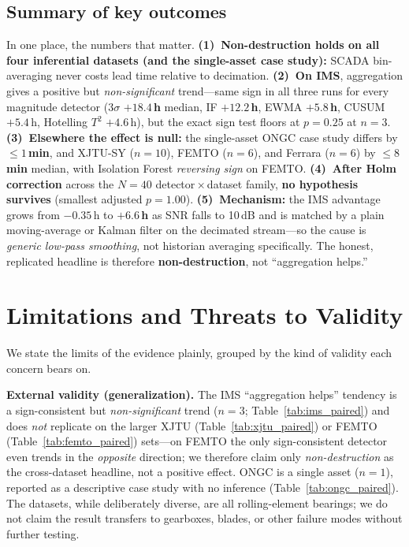 \documentclass[journal]{IEEEtran}
\begin{document}
\subsection{Summary of key outcomes}
In one place, the numbers that matter. \textbf{(1)~Non-destruction holds on all four inferential
datasets (and the single-asset case study):} SCADA bin-averaging never costs lead
time relative to decimation. \textbf{(2)~On IMS}, aggregation gives a positive but
\emph{non-significant} trend---same sign in all three runs for every magnitude
detector (3$\sigma$ \textbf{$+18.4$\,h} median, IF \textbf{$+12.2$\,h}, EWMA
\textbf{$+5.8$\,h}, CUSUM $+5.4$\,h, Hotelling $T^2$ $+4.6$\,h), but the exact
sign test floors at \textbf{$p{=}0.25$} at $n{=}3$. \textbf{(3)~Elsewhere the
effect is null:} the single-asset ONGC case study differs by \textbf{$\le1$\,min},
and XJTU-SY
($n{=}10$), FEMTO ($n{=}6$), and Ferrara ($n{=}6$) by \textbf{$\le8$\,min} median,
with Isolation Forest \emph{reversing sign} on FEMTO. \textbf{(4)~After Holm correction} across
the \textbf{$N{=}40$} detector\,$\times$\,dataset family, \textbf{no hypothesis
survives} (smallest adjusted $p{=}\mathbf{1.00}$). \textbf{(5)~Mechanism:} the
IMS advantage grows from $-0.35$\,h to \textbf{$+6.6$\,h} as SNR falls to 10\,dB
and is matched by a plain moving-average or Kalman filter on the decimated
stream---so the cause is \emph{generic low-pass smoothing}, not historian
averaging specifically. The honest, replicated headline is therefore
\textbf{non-destruction}, not ``aggregation helps.''

\section{Limitations and Threats to Validity}
\label{sec:threats}
We state the limits of the evidence plainly, grouped by the kind of validity
each concern bears on.

\textbf{External validity (generalization).} The IMS ``aggregation helps''
tendency is a sign-consistent but \emph{non-significant} trend ($n{=}3$;
Table~\ref{tab:ims_paired}) and does \emph{not} replicate on the larger XJTU
(Table~\ref{tab:xjtu_paired}) or FEMTO (Table~\ref{tab:femto_paired}) sets---on
FEMTO the only sign-consistent detector even trends in the \emph{opposite}
direction; we therefore claim only \emph{non-destruction} as
the cross-dataset headline, not a positive effect. ONGC is a single asset
($n{=}1$), reported as a descriptive case study with no inference
(Table~\ref{tab:ongc_paired}). The datasets, while deliberately diverse, are all rolling-element bearings; we do not claim the result transfers to
gearboxes, blades, or other failure modes without further testing.
\end{document}
